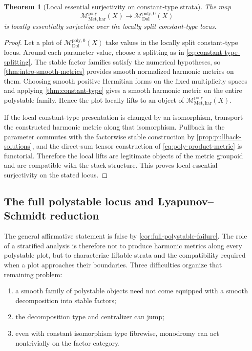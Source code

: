 \documentclass[11pt,reqno]{amsart}
\newtheorem{theorem}{Theorem}[section]
\theoremstyle{definition}
\theoremstyle{remark}
\newcommand{\Dol}{\mathrm{Dol}}
\newcommand{\har}{\mathrm{har}}
\newcommand{\poly}{\mathrm{poly}}
\newcommand{\MdiffDol}{\mathscr M_{\Dol}}
\newcommand{\MetHar}{\mathscr M_{\mathrm{Met},\har}}
\begin{document}
\begin{theorem}[Local essential surjectivity on constant-type strata]\label{thm:essential-surjectivity-constant}
The map
\[
  \MetHar^{\poly}(X)\to\MdiffDol^{\poly,0}(X)
\]
is locally essentially surjective over the locally split constant-type locus.
\end{theorem}

\begin{proof}
Let a plot of $\MdiffDol^{\poly,0}(X)$ take values in the locally split constant-type locus.  Around each parameter value, choose a splitting as in \eqref{eq:constant-type-splitting}.  The stable factor families satisfy the numerical hypotheses, so \cref{thm:intro-smooth-metrics} provides smooth normalized harmonic metrics on them.  Choosing smooth positive Hermitian forms on the fixed multiplicity spaces and applying \cref{thm:constant-type} gives a smooth harmonic metric on the entire polystable family.  Hence the plot locally lifts to an object of $\MetHar^{\poly}(X)$.

If the local constant-type presentation is changed by an isomorphism, transport the constructed harmonic metric along that isomorphism.  Pullback in the parameter commutes with the factorwise stable construction by \cref{prop:pullback-solutions}, and the direct-sum tensor construction of \eqref{eq:poly-product-metric} is functorial.  Therefore the local lifts are legitimate objects of the metric groupoid and are compatible with the stack structure.  This proves local essential surjectivity on the stated locus.
\end{proof}

\subsection{The full polystable locus and Lyapunov--Schmidt reduction}

The general affirmative statement is false by \cref{cor:full-polystable-failure}.  The role of a stratified analysis is therefore not to produce harmonic metrics along every polystable plot, but to characterize liftable strata and the compatibility required when a plot approaches their boundaries.  Three difficulties organize that remaining problem:
\begin{enumerate}[label=(\roman*)]
\item a smooth family of polystable objects need not come equipped with a smooth decomposition into stable factors;
\item the decomposition type and centralizer can jump;
\item even with constant isomorphism type fibrewise, monodromy can act nontrivially on the factor category.
\end{enumerate}
\end{document}
